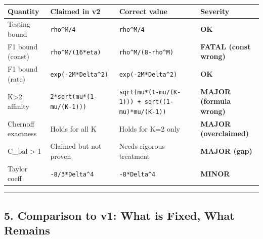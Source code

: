 \documentclass[
  12pt,
]{article}
\begin{document}
\begin{longtable}[]{@{}
  >{\raggedright\arraybackslash}p{}
  >{\raggedright\arraybackslash}p{}
  >{\raggedright\arraybackslash}p{}
  >{\raggedright\arraybackslash}p{}@{}}
\toprule\noalign{}
\begin{minipage}[b]{\linewidth}\raggedright
Quantity
\end{minipage} & \begin{minipage}[b]{\linewidth}\raggedright
Claimed in v2
\end{minipage} & \begin{minipage}[b]{\linewidth}\raggedright
Correct value
\end{minipage} & \begin{minipage}[b]{\linewidth}\raggedright
Severity
\end{minipage} \\
\midrule\noalign{}
\endhead
\bottomrule\noalign{}
\endlastfoot
Testing bound & \texttt{rho\^{}M/4} & \texttt{rho\^{}M/4} &
\textbf{OK} \\
F1 bound (const) & \texttt{rho\^{}M/(16*eta)} &
\texttt{rho\^{}M/(8-rho\^{}M)} & \textbf{FATAL (const wrong)} \\
F1 bound (rate) & \texttt{exp(-2M*Delta\^{}2)} &
\texttt{exp(-2M*Delta\^{}2)} & \textbf{OK} \\
K\textgreater2 affinity & \texttt{2*sqrt(mu*(1-mu/(K-1)))} &
\texttt{sqrt(mu*(1-mu/(K-1)))\ +\ sqrt((1-mu)*mu/(K-1))} & \textbf{MAJOR
(formula wrong)} \\
Chernoff exactness & Holds for all K & Holds for K=2 only &
\textbf{MAJOR (overclaimed)} \\
C\_bal \textgreater{} 1 & Claimed but not proven & Needs rigorous
treatment & \textbf{MAJOR (gap)} \\
Taylor coeff & \texttt{-8/3*Delta\^{}4} & \texttt{-8*Delta\^{}4} &
\textbf{MINOR} \\
\end{longtable}

\begin{center}\rule{0.5\linewidth}{0.5pt}\end{center}

\subsection{5. Comparison to v1: What is Fixed, What
Remains}\label{comparison-to-v1-what-is-fixed-what-remains}
\end{document}
